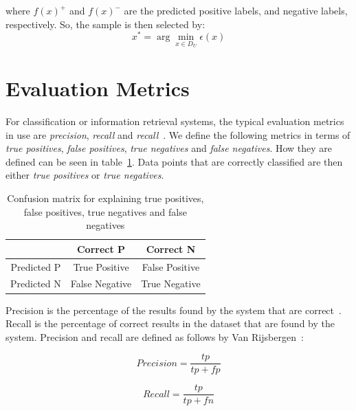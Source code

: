 where $f(x)^+$ and $f(x)^-$ are the predicted positive labels, and negative labels, respectively.
So, the sample is then selected by:
\begin{equation}
    x^* = \arg \min_{x \in D_U} \epsilon(x)
\end{equation}

\section{Evaluation Metrics}\label{sec:evaluation-metrics}

For classification or information retrieval systems, the typical evaluation metrics in use are \textit{precision}, \textit{recall} and \textit{recall}~\cite{jiang2012information}.
We define the following metrics in terms of \textit{true positives}, \textit{false positives}, \textit{true negatives} and \textit{false negatives}.
How they are defined can be seen in table~\ref{tab:conf-matr}.
Data points that are correctly classified are then either \textit{true positives} or \textit{true negatives}.

\begin{table}[!ht]
    \begin{center}
        \begin{tabular}{c c c}
            & Correct P & Correct N \\
            \toprule
            Predicted P & True Positive & False Positive \\
            Predicted N & False Negative & True Negative \\
        \end{tabular}
    \end{center}
    \caption{Confusion matrix for explaining true positives, false positives, true negatives and false negatives}\label{tab:conf-matr}
\end{table}

Precision is the percentage of the results found by the system that are correct~\cite{tjong2003introduction}.
Recall is the percentage of correct results in the dataset that are found by the system.
Precision and recall are defined as follows by Van Rijsbergen~\cite{rijsenbergen1979information}:

\begin{equation}
    Precision = \frac{tp}{tp+fp}
\end{equation}

\begin{equation}
    Recall = \frac{tp}{tp+fn}
\end{equation}

